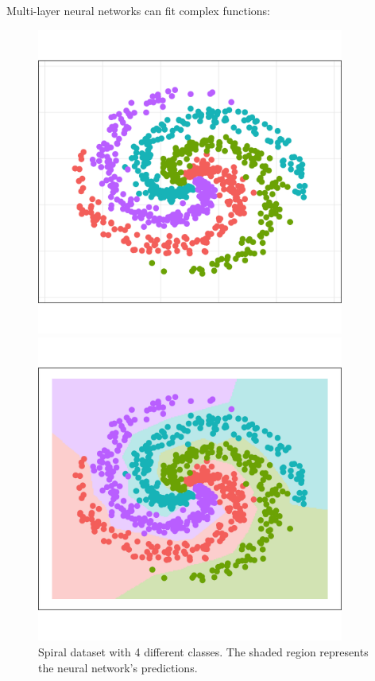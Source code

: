 \documentclass{beamer}
\begin{document}
\begin{frame}



Multi-layer neural networks can fit complex functions:

\begin{figure}[h!]
\centering
\begin{minipage}{.5\textwidth}
  \centering
  \includegraphics[width=0.9\textwidth]{figures/spiral.png}
\end{minipage}%
\begin{minipage}{.5\textwidth}
  \centering
  \includegraphics[width=0.9\textwidth]{figures/spiral2.png}
\end{minipage}
\caption{Spiral dataset with 4 different classes.  The shaded region represents the neural network's predictions.}
\end{figure}



\end{frame}
\end{document}
